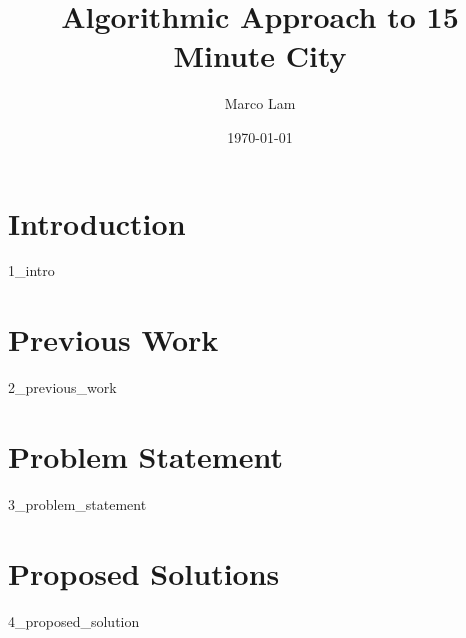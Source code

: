 \documentclass{article}
\title{Algorithmic Approach to 15 Minute City}
\author{Marco Lam}
\date{\today}
\begin{document}
\maketitle

\newpage

\tableofcontents

\newpage

\section{Introduction}

{1_intro}

\section{Previous Work}

{2_previous_work}

\newpage

\section{Problem Statement}

{3_problem_statement}

\newpage

\section{Proposed Solutions}

{4_proposed_solution}

\newpage


\end{document}
